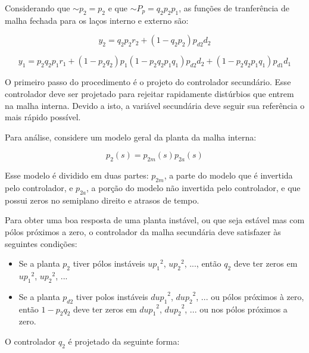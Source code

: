     Considerando que $\sim$$p_2 = p_2$ e que $\sim$$P_p = q_2 p_2 p_1$, as funções de
    tranferência de malha fechada para os laços interno e externo são:

    \begin{equation}
        y_2 = q_2 p_2 r_2 + \left( 1- q_2 p_2 \right) p_{d2} d_2
    \end{equation}

    \begin{equation}
        y_1 = p_2 q_2 p_1 r_1 + \left( 1 - p_2 q_2 \right) p_1 \left(
            1 - p_2 q_2 p_1 q_1 \right) p_{d2} d_2 + \left( 1 - p_2 q_2 p_1 q_1
            \right) p_{d1} d_1
    \end{equation}

    O primeiro passo do procedimento é o projeto do controlador secundário. Esse
    controlador deve ser projetado para rejeitar rapidamente distúrbios que entrem
    na malha interna. Devido a isto, a variável secundária deve seguir sua referência
    o mais rápido possível.

    Para análise, considere um modelo geral da planta da malha interna:

    \begin{equation}
        p_2(s) = p_{2m}(s) p_{2a}(s)
    \end{equation}

    Esse modelo é dividido em duas partes: $p_{2m}$, a parte do modelo que é invertida
    pelo controlador, e $p_{2a}$, a porção do modelo não invertida pelo controlador,
    e que possui zeros no semiplano direito e atrasos de tempo.

    Para obter uma boa resposta de uma planta instável, ou que seja estável mas com
    pólos próximos a zero, o controlador da malha secundária deve satisfazer às
    seguintes condições:

    \begin{itemize}
        \item Se a planta $p_2$ tiver pólos instáveis ${up_1}^2$, ${up_2}^2$, ...,
        então $q_2$ deve ter zeros em ${up_1}^2$, ${up_2}^2$, ...
        \item Se a planta $p_{d2}$ tiver polos instáveis ${dup_1}^2$, ${dup_2}^2$,
        ... ou pólos próximos à zero, então $1 - p_2 q_2$ deve ter zeros em
        ${dup_1}^2$, ${dup_2}^2$, ... ou nos pólos próximos a zero.
    \end{itemize}

    O controlador $q_2$ é projetado da seguinte forma:

